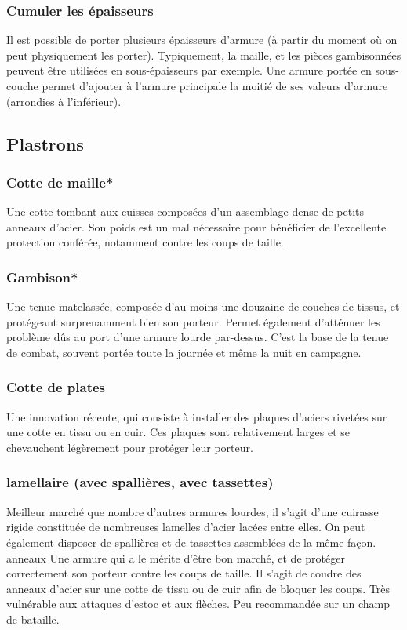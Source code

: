 \documentclass[10pt,a4paper,twocolumn]{book}
\begin{document}
\subsubsection{Cumuler les épaisseurs}
Il est possible de porter plusieurs épaisseurs d’armure (à partir du moment où on peut physiquement les porter). Typiquement, la maille,  et les pièces gambisonnées peuvent être utilisées en sous-épaisseurs par exemple.
Une armure portée en sous-couche permet d’ajouter à l’armure principale la moitié de ses valeurs d’armure (arrondies à l’inférieur).
\subsection{Plastrons}
\subsubsection{Cotte de maille*}
Une cotte tombant aux cuisses composées d'un assemblage dense de petits anneaux d'acier. Son poids est un mal nécessaire pour bénéficier de l'excellente protection conférée, notamment contre les coups de taille.
\subsubsection{Gambison*}
Une tenue matelassée, composée d'au moins une douzaine de couches de tissus, et protégeant surprenamment bien son porteur. Permet également d'atténuer les problème dûs au port d'une armure lourde par-dessus. C'est la base de la tenue de combat, souvent portée toute la journée et même la nuit en campagne.
\subsubsection{Cotte de plates}
Une innovation récente, qui consiste à installer des plaques d'aciers rivetées sur une cotte en tissu ou en cuir. Ces plaques sont relativement larges et se chevauchent légèrement pour protéger leur porteur.
\subsubsection{lamellaire (avec spallières, avec tassettes)}
Meilleur marché que nombre d'autres armures lourdes, il s'agit d'une cuirasse rigide constituée de nombreuses lamelles d'acier lacées entre elles. On peut également disposer de spallières et de tassettes assemblées de la même façon.
anneaux
Une armure qui a le mérite d'être bon marché, et de protéger correctement son porteur contre les coups de taille. Il s'agit de coudre des anneaux d'acier sur une cotte de tissu ou de cuir afin de bloquer les coups. Très vulnérable aux attaques d'estoc et aux flèches. Peu recommandée sur un champ de bataille.
\end{document}
